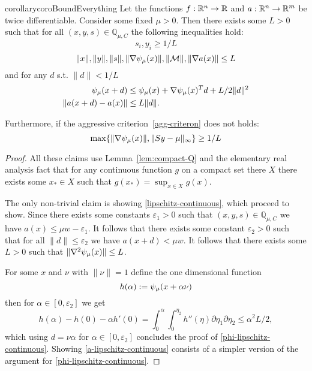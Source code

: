 \documentclass{article}
\begin{document}
\begin{restatable}{corollary}{coroBoundEverything}\label{coro:bound-everything}
Let the functions $f : \mathbb{R}^{n} \rightarrow \mathbb{R}$ and $a : \mathbb{R}^{n} \rightarrow \mathbb{R}^{m}$ be twice differentiable. Consider some fixed $\mu > 0$.
Then there exists some $L > 0$ such that for all $(x, y, s) \in \mathbb{Q}_{\mu, C}$ the following inequalities hold:
$$
s_i, y_i \ge 1/L
$$
$$
\| x \|, \| y \|, \| s \|, \| \nabla \psi_{\mu}(x) \|, \| \mathcal{M} \|, \| \nabla a(x) \| \le L
$$
and for any $d$ s.t. $\| d \| < 1 / L$
\begin{subequations}\label{lipschitz-continuous}
\begin{flalign}
\psi_{\mu}(x + d) &\le \psi_{\mu}(x) + \nabla \psi_{\mu}(x)^T d + L / 2 \| d \|^2 \label{phi-lipschitz-continuous} \\
\| a(x + d) - a(x) \| &\le L  \| d \|. \label{a-lipschitz-continuous}
\end{flalign}
\end{subequations}

Furthermore, if the aggressive criterion~\eqref{agg-criteron} does not holds:
$$
\max\{ \| \nabla \psi_{\mu}(x) \|, \| S y - \mu \|_{\infty} \} \ge 1 / L
$$
\end{restatable}

\begin{proof}
All these claims use Lemma~\ref{lem:compact-Q} and the elementary real analysis fact that for any continuous function $g$ on a compact set there $X$ there exists some $x_{*} \in X$ such that $g(x_{*}) = \sup_{x \in X}{g(x)}$.

The only non-trivial claim is showing \eqref{lipschitz-continuous}, which proceed to show. Since there exists some constants $\varepsilon_{1} > 0$ such that $(x,y,s) \in \mathbb{Q}_{\mu, C}$ we have $a(x) \le \mu w - \varepsilon_{1}$. It follows that there exists some constant $\varepsilon_2 > 0$ such that for all $\| d \| \le \varepsilon_2$ we have $a(x + d) < \mu w$. It follows that there exists some $L > 0$ such that $\| \nabla^2 \psi_{\mu}(x) \| \le L$.

For some $x$ and $\nu$ with $\| \nu \| = 1$ define the one dimensional function
$$
h(\alpha) :=  \psi_{\mu}(x + \alpha \nu) 
$$
then for $\alpha \in [0, \varepsilon_2]$ we get
$$
h(\alpha) - h(0) - \alpha h'(0) = \int_{0}^{\alpha}{ \int_{0}^{\eta_{2}}{h''(\eta) \partial \eta_{1} \partial \eta_{2}} } \le \alpha^2 L / 2,
$$
which using $d = \nu \alpha$ for $\alpha \in [0, \varepsilon_2]$ concludes the proof of \eqref{phi-lipschitz-continuous}. Showing \eqref{a-lipschitz-continuous} consists of a simpler version of the argument for \eqref{phi-lipschitz-continuous}.
\end{proof}
\end{document}
